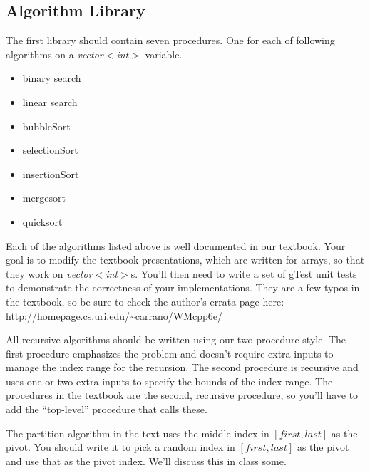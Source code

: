 \documentclass[]{tufte-handout}
\begin{document}
\subsection{Algorithm Library}
The first library should contain seven procedures. One for each of following algorithms on a \textit{vector$<$int$>$} variable.
\begin{itemize}
\item binary search 
\item linear search
\item bubbleSort
\item selectionSort
\item insertionSort
\item mergesort
\item quicksort
\end{itemize}
Each of the algorithms listed above is well documented in our textbook. Your goal is to modify the textbook presentations, which are written for arrays, so that they work on  
\textit{vector$<$int$>$}s. You'll then need to write a set of gTest unit tests to demonstrate the correctness of your implementations. They are a few typos in the textbook, so be sure to check the author's errata page here: \url{http://homepage.cs.uri.edu/~carrano/WMcpp6e/}

All recursive algorithms should be written using our two procedure style. The first procedure emphasizes the problem and doesn't require extra inputs to manage the index range for the recursion. The second procedure is recursive and uses one or two extra inputs to specify the bounds of the index range.  The procedures in the textbook are the second, recursive procedure, so you'll have to add the ``top-level'' procedure that calls these.

The partition algorithm in the text uses the middle index in $[first,last]$ as the pivot. You should write it to pick a random index in $[first,last]$ as the pivot and use that as the pivot index. We'll discuss this in class some.
\end{document}
